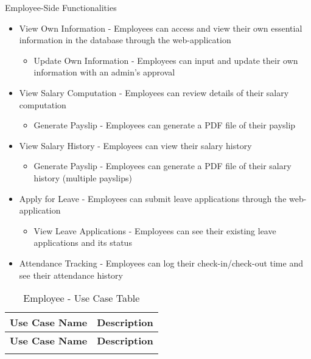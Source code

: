 \documentclass{icsthesis}
\begin{document}
\begin{mainmatter}
\begin{itemize}
    
\end{itemize}
Employee-Side Functionalities
\begin{itemize}
    \item View Own Information - Employees can access and view their own essential information in the database through the web-application
    \begin{itemize}
        \item Update Own Information - Employees can input and update their own information with an admin’s approval
    \end{itemize}
    \item View Salary Computation - Employees can review details of their salary computation
    \begin{itemize}
        \item Generate Payslip - Employees can generate a PDF file of their payslip
    \end{itemize}
    \item View Salary History - Employees can view their salary history
    \begin{itemize}
        \item Generate Payslip - Employees can generate a PDF file of their salary history (multiple payslips)
    \end{itemize}
    \item Apply for Leave - Employees can submit leave applications through the web-application
    \begin{itemize}
        \item View Leave Applications - Employees can see their existing leave applications and its status 
    \end{itemize}
    \item Attendance Tracking - Employees can log their check-in/check-out time and see their attendance history
\end{itemize}

\renewcommand{\arraystretch}{1.3} %
\begin{longtable}{|p{}|p{}|}
\caption{Employee - Use Case Table} \label{tab:employee-usecase} \\
\hline
\textbf{Use Case Name} & \textbf{Description} \\
\hline
\endfirsthead

\hline
\textbf{Use Case Name} & \textbf{Description} \\
\hline
\endhead

\hline
\endfoot


\end{longtable}
\end{mainmatter}
\end{document}
